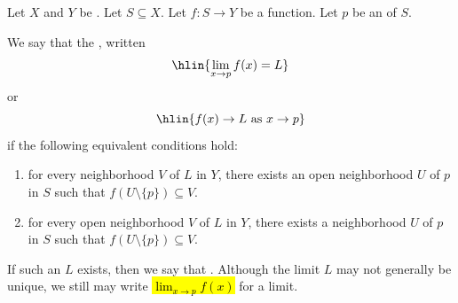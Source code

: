 \begin{definition} \label{definition:limit_of_a_function_between_topological_spaces_at_an_accumulation_point}
    Let $X$ and $Y$ be . Let $S \subseteq X$. Let $f: S \to Y$ be a function. Let $p$ be an  of $S$.

    We say that the , written
    $$\hlin{\lim_{x \to p} f(x) = L}$$
    or
    $$\hlin{f(x) \to L \text{ as } x \to p}$$
    if the following equivalent conditions hold:
    \begin{enumerate}
        \item for every neighborhood $V$ of $L$ in $Y$, there exists an open neighborhood $U$ of $p$ in $S$ such that $f( U \setminus \{p\}) \subseteq V$.
        \item for every open neighborhood $V$ of $L$ in $Y$, there exists a neighborhood $U$ of $p$ in $S$ such that $f( U \setminus \{p\}) \subseteq V$.
    \end{enumerate}
    If such an $L$ exists, then we say that . Although the limit $L$ may not generally be unique, we still may write \hl{$\lim_{x \to p} f(x)$} for a limit.
\end{definition}